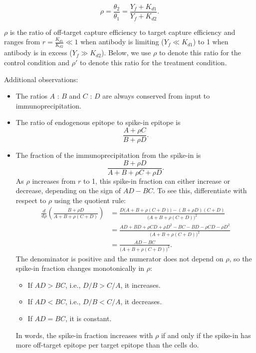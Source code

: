 \documentclass[11pt]{article}
\begin{document}
$$
\rho = \frac{\theta_2}{\theta_1} = \frac{Y_f + K_{d1}}{Y_f + K_{d2}}.
$$

$\rho$ is the ratio of off-target capture efficiency to target capture efficiency and ranges from $r = \frac{K_{d1}}{K_{d2}} \ll 1$ when antibody is limiting ($Y_f \ll K_{d1}$) to 1 when antibody is in excess ($Y_f \gg K_{d2}$). Below, we use $\rho$ to denote this ratio for the control condition and $\rho'$ to denote this ratio for the treatment condition.

Additional observations:
\begin{itemize}
\item The ratios $A$ : $B$ and $C$ : $D$ are always conserved from input to immunoprecipitation.
\item The ratio of endogenous epitope to spike-in epitope is 
$$
\frac{A + \rho C}{B + \rho D}.
$$
\item The fraction of the immunoprecipitation from the spike-in is
$$
\frac{B + \rho D}{A + B + \rho C + \rho D}.
$$
As $\rho$ increases from $r$ to 1, this spike-in fraction can either
increase or decrease, depending on the sign of $AD-BC$. To see this,
differentiate with respect to $\rho$ using the quotient rule:
$$\begin{aligned}
\frac{d}{d\rho}\left(\frac{B+\rho D}{A+B+\rho(C+D)}\right)
&=\frac{D\bigl(A+B+\rho(C+D)\bigr)-(B+\rho D)(C+D)}
{\bigl(A+B+\rho(C+D)\bigr)^2} \\
&=\frac{AD+BD+\rho CD+\rho D^2-BC-BD-\rho CD-\rho D^2}
{\bigl(A+B+\rho(C+D)\bigr)^2} \\
&=\frac{AD-BC}{\bigl(A+B+\rho(C+D)\bigr)^2}.
\end{aligned}$$
The denominator is positive and the numerator does not depend on $\rho$,
so the spike-in fraction changes monotonically in $\rho$:
\begin{itemize}
    \item If $AD>BC$, i.e., $D/B>C/A$, it increases.
    \item If $AD<BC$, i.e., $D/B<C/A$, it decreases.
    \item If $AD=BC$, it is constant.
\end{itemize}
In words, the spike-in fraction increases with $\rho$ if and only if the
spike-in has more off-target epitope per target epitope than the cells
do.

\end{itemize}
\end{document}

